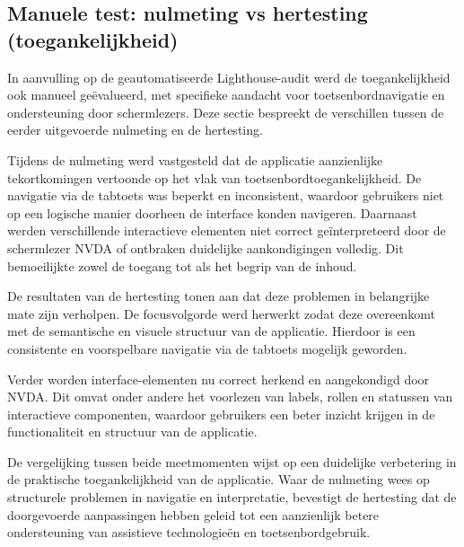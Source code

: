 \subsection{Manuele test: nulmeting vs hertesting (toegankelijkheid)}
In aanvulling op de geautomatiseerde Lighthouse-audit werd de toegankelijkheid ook manueel geëvalueerd, met specifieke aandacht voor toetsenbordnavigatie en ondersteuning door schermlezers. Deze sectie bespreekt de verschillen tussen de eerder uitgevoerde nulmeting en de hertesting.

Tijdens de nulmeting werd vastgesteld dat de applicatie aanzienlijke tekortkomingen vertoonde op het vlak van toetsenbordtoegankelijkheid. De navigatie via de tabtoets was beperkt en inconsistent, waardoor gebruikers niet op een logische manier doorheen de interface konden navigeren. Daarnaast werden verschillende interactieve elementen niet correct geïnterpreteerd door de schermlezer NVDA of ontbraken duidelijke aankondigingen volledig. Dit bemoeilijkte zowel de toegang tot als het begrip van de inhoud.

De resultaten van de hertesting tonen aan dat deze problemen in belangrijke mate zijn verholpen. De focusvolgorde werd herwerkt zodat deze overeenkomt met de semantische en visuele structuur van de applicatie. Hierdoor is een consistente en voorspelbare navigatie via de tabtoets mogelijk geworden.

Verder worden interface-elementen nu correct herkend en aangekondigd door NVDA. Dit omvat onder andere het voorlezen van labels, rollen en statussen van interactieve componenten, waardoor gebruikers een beter inzicht krijgen in de functionaliteit en structuur van de applicatie.

De vergelijking tussen beide meetmomenten wijst op een duidelijke verbetering in de praktische toegankelijkheid van de applicatie. Waar de nulmeting wees op structurele problemen in navigatie en interpretatie, bevestigt de hertesting dat de doorgevoerde aanpassingen hebben geleid tot een aanzienlijk betere ondersteuning van assistieve technologieën en toetsenbordgebruik.
